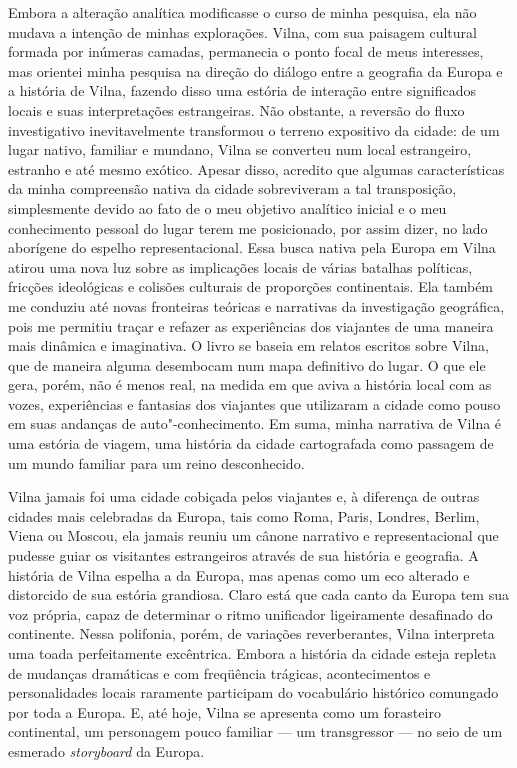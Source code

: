 Embora a alteração analítica modificasse o curso de minha pesquisa, ela
não mudava a intenção de minhas explorações. Vilna, com sua paisagem
cultural formada por inúmeras camadas, permanecia o ponto focal de meus
interesses, mas orientei minha pesquisa na direção do diálogo entre a
geografia da Europa e a história de Vilna, fazendo disso uma estória de
interação entre significados locais e suas interpretações estrangeiras.
Não obstante, a reversão do fluxo investigativo inevitavelmente
transformou o terreno expositivo da cidade: de um lugar nativo, familiar
e mundano, Vilna se converteu num local estrangeiro, estranho e até
mesmo exótico. Apesar disso, acredito que algumas características da
minha compreensão nativa da cidade sobreviveram a tal transposição,
simplesmente devido ao fato de o meu objetivo analítico inicial e o meu
conhecimento pessoal do lugar terem me posicionado, por assim dizer, no
lado aborígene do espelho representacional. Essa busca nativa pela
Europa em Vilna atirou uma nova luz sobre as implicações locais de
várias batalhas políticas, fricções ideológicas e colisões culturais de
proporções continentais. Ela também me conduziu até novas fronteiras
teóricas e narrativas da investigação geográfica, pois me permitiu
traçar e refazer as experiências dos viajantes de uma maneira mais
dinâmica e imaginativa. O livro se baseia em relatos escritos sobre
Vilna, que de maneira alguma desembocam num mapa definitivo do lugar. O
que ele gera, porém, não é menos real, na medida em que aviva a história
local com as vozes, experiências e fantasias dos viajantes que
utilizaram a cidade como pouso em suas andanças de auto"-conhecimento. Em
suma, minha narrativa de Vilna é uma estória de viagem, uma história da
cidade cartografada como passagem de um mundo familiar para um reino
desconhecido.

Vilna jamais foi uma cidade cobiçada pelos viajantes e, à diferença de
outras cidades mais celebradas da Europa, tais como Roma, Paris,
Londres, Berlim, Viena ou Moscou, ela jamais reuniu um cânone narrativo
e representacional que pudesse guiar os visitantes estrangeiros através
de sua história e geografia. A história de Vilna espelha a da Europa,
mas apenas como um eco alterado e distorcido de sua estória grandiosa.
Claro está que cada canto da Europa tem sua voz própria, capaz de
determinar o ritmo unificador ligeiramente desafinado do continente.
Nessa polifonia, porém, de variações reverberantes, Vilna interpreta uma
toada perfeitamente excêntrica. Embora a história da cidade esteja
repleta de mudanças dramáticas e com freqüência trágicas, acontecimentos
e personalidades locais raramente participam do vocabulário histórico
comungado por toda a Europa. E, até hoje, Vilna se apresenta como um
forasteiro continental, um personagem pouco familiar --- um transgressor ---
no seio de um esmerado \emph{storyboard} da Europa.

